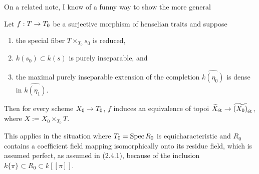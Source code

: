 \documentclass[deligne.tex]{subfiles}
\begin{document}
On a related note, I know of a funny way to show the more general
\begin{lemma*}
	Let $f:T\rightarrow T_0$ be a surjective morphism of henselian traits and suppose
	\begin{enumerate}[label=(\greek*)]
	\item the special fiber $T\times_{T_0}s_0$ is reduced,
	\item $k(s_0)\subset k(s)$ is purely inseparable, and
	\item the maximal purely inseparable extension of the completion $\widehat{k(\eta_0)}$ is dense in $\widehat{k(\eta_1)}$.
	\end{enumerate}
	Then for every scheme $X_0\rightarrow T_0$,
	$f$ induces an equivalence of topoi
	$\widetilde X_{\acute{\mathrm{e}}\mathrm t}\rightarrow \widetilde{(X_{0})}_{\acute{\mathrm{e}}\mathrm t}$, where $X:=X_0\times_{T_0}T$.
\end{lemma*}
This applies in the situation where $T_0=\operatorname{Spec} R_0$ is equicharacteristic
and $R_0$ contains a coefficient field mapping isomorphically onto its 
residue field, which is assumed perfect, as assumed in (2.4.1),
because of the inclusion $k\{\pi\}\subset R_0\subset k[[\pi]]$.
\end{document}

